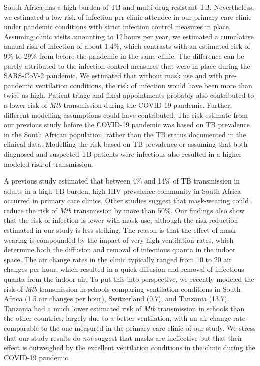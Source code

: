 \documentclass[fleqn,11pt]{wlscirep}
\begin{document}
South Africa has a high burden of TB and multi-drug-resistant TB\cite{WHO2023TBReport}. Nevertheless, we estimated a low risk of infection per clinic attendee in our primary care clinic under pandemic conditions with strict infection control measures in place. Assuming clinic visits amounting to 12\,hours per year, we estimated a cumulative annual risk of infection of about 1.4\%, which contrasts with an estimated risk of 9\% to 29\% from before the pandemic in the same clinic\cite{Zurcher2022JID}. The difference can be partly attributed to the infection control measures that were in place during the SARS-CoV-2 pandemic. We estimated that without mask use and with pre-pandemic ventilation conditions, the risk of infection would have been more than twice as high. Patient triage and fixed appointments probably also contributed to a lower risk of \emph{Mtb} transmission during the COVID-19 pandemic. Further, different modelling assumptions could have contributed. The risk estimate from our previous study before the COVID-19 pandemic\cite{Zurcher2022JID} was based on TB prevalence in the South African population, rather than the TB status documented in the clinical data. Modelling the risk based on TB prevalence or assuming that both diagnosed and suspected TB patients were infectious also resulted in a higher modeled risk of transmission. 

A previous study estimated that between 4\% and 14\% of TB transmission in adults in a high TB burden, high HIV prevalence community in South Africa occurred in primary care clinics\cite{McCreesh2022BMJGlobalHealth}. Other studies suggest that mask-wearing could reduce the risk of \emph{Mtb} transmission by more than 50\%\cite{Dharmadhikari2012AJRCCM,McCreesh2021BMJGlobalHealth}. Our findings also show that the risk of infection is lower with mask use, although the risk reduction estimated in our study is less striking. The reason is that the effect of mask-wearing is compounded by the impact of very high ventilation rates, which determine both the diffusion and removal of infectious quanta in the indoor space. The air change rates in the clinic typically ranged from 10 to 20 air changes per hour, which resulted in a quick diffusion and removal of infectious quanta from the indoor air. To put this into perspective, we recently modeled the risk of \emph{Mtb} transmission in schools comparing ventilation conditions in South Africa (1.5 air changes per hour), Switzerland (0.7), and Tanzania (13.7)\cite{Banholzer2024PGPH}. Tanzania had a much lower estimated risk of \emph{Mtb} transmission in schools than the other countries, largely due to a better ventilation, with an air change rate comparable to the one measured in the primary care clinic of our study. We stress that our study results do \emph{not} suggest that masks are ineffective but that their effect is outweighed by the excellent ventilation conditions in the clinic during the COVID-19 pandemic.
\end{document}
